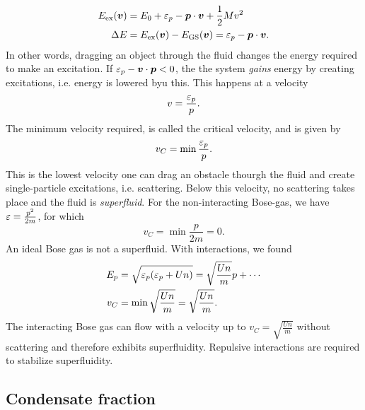 \begin{align}
	E_{\text{ex}}(\bm{v}) &= E_0 + \varepsilon_p -\bm{p}\cdot \bm{v}  + \frac{1}{2}Mv^2 \\
	\Delta E &= E_{\text{ex}}(\bm{v}) - E_{\text{GS}}(\bm{v}) = \varepsilon_{p}-\bm{p}\cdot\bm{v}.
\end{align}
In other words, dragging an object through the fluid changes the energy required to make an excitation. If $\varepsilon_p - \bm{v}\cdot\bm{p}<0$, the the system \emph{gains} energy by creating excitations, i.e. energy is lowered byu this. This happens at a velocity 
\begin{equation}
	v = \frac{\varepsilon_p}{p}.
\end{equation}
The minimum velocity required, is called the critical velocity, and is given by
\begin{equation}
	v_C = \min\frac{\varepsilon_p}{p}.
\end{equation}
This is the lowest velocity one can drag an obstacle thourgh the fluid and create single-particle excitations, i.e. scattering. Below this velocity, no scattering takes place and the fluid is \emph{superfluid}. For the non-interacting Bose-gas, we have $\varepsilon = \frac{p^2}{2m}$, for which
\begin{equation}
	v_C = \min \frac{p}{2m} =0.
\end{equation}
An ideal Bose gas is not a superfluid. 
With interactions, we found
\begin{align}
	E_p &= \sqrt{\varepsilon_p(\varepsilon_p + Un)} = \sqrt{\frac{Un}{m}}p + \cdots \\
	v_C &= \min\sqrt{\frac{Un}{m}} = \sqrt{\frac{Un}{m}}.  
\end{align}
The interacting Bose gas can  flow with a velocity up to $v_C = \sqrt{\frac{Un}{m}}$ without scattering and therefore exhibits superfluidity. Repulsive interactions are required to stabilize superfluidity. 


\subsection{Condensate fraction}


